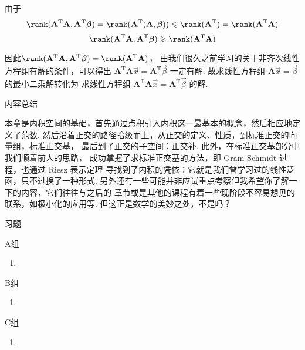 {    由于
    \[\rank(\mathbf{A}^{\mathrm{T}}\mathbf{A}, \mathbf{A}^{\mathrm{T}}\vec{\beta}) 
    = \rank (\mathbf{A}^{\mathrm{T}}(\mathbf{A}, \vec{\beta})) \leqslant \rank(\mathbf{A}^{\mathrm{T}}) = \rank(\mathbf{A}^{\mathrm{T}}\mathbf{A})\]
    \[\rank(\mathbf{A}^{\mathrm{T}}\mathbf{A}, \mathbf{A}^{\mathrm{T}}\vec{\beta}) \geqslant \rank(\mathbf{A}^{\mathrm{T}}\mathbf{A})\]

    因此$\rank(\mathbf{A}^{\mathrm{T}}\mathbf{A}, \mathbf{A}^{\mathrm{T}}\vec{\beta}) = \rank(\mathbf{A}^{\mathrm{T}}\mathbf{A})$，
    由我们很久之前学习的关于非齐次线性方程组有解的条件，可以得出 $ \mathbf{A}^{\mathrm{T}}\mathbf{A}\vec{x} = \mathbf{A}^{\mathrm{T}}\vec{\beta}$ 一定有解. 
    故求线性方程组 $\mathbf{A}\vec{x} = \vec{\beta}$ 的最小二乘解转化为
    求线性方程组 $ \mathbf{A}^{\mathrm{T}}\mathbf{A}\vec{x} = \mathbf{A}^{\mathrm{T}}\vec{\beta}$ 的解. 
}

\vspace{2ex} 

\centerline{\heiti \Large 内容总结}

本章是内积空间的基础，首先通过点积引入内积这一最基本的概念，然后相应地定义了范数. 
然后沿着正交的路径拾级而上，从正交的定义、性质，到标准正交的向量组，标准正交基，
最后到了正交的子空间：正交补. 此外，在标准正交基部分中我们顺着前人的思路，
成功掌握了求标准正交基的方法，即 Gram-Schmidt 过程，也通过 Riesz 表示定理
寻找到了内积的凭依：它就是我们曾学习过的线性泛函，只不过换了一种形式. 
另外还有一些可能并非应试重点考察但我希望你了解一下的内容，它们往往与之后的
章节或是其他的课程有着一些现阶段不容易想见的联系，如极小化的应用等. 
但这正是数学的美妙之处，不是吗？

\vspace{2ex} 

\centerline{\heiti \Large 习题}
\vspace{2ex} 
{\kaishu }
\begin{flushright}
    \kaishu

\end{flushright}
\centerline{\heiti A组}
\begin{enumerate}
	\item 
\end{enumerate}
\centerline{\heiti B组}
\begin{enumerate}
	\item 
\end{enumerate}
\centerline{\heiti C组}
\begin{enumerate}
	\item 
\end{enumerate}
